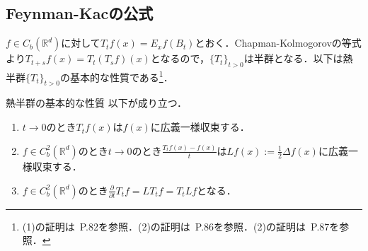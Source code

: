\documentclass[dvipdfmx]{jsarticle}
\begin{document}
\subsection{Feynman-Kacの公式}
$f\in C_b(\mathbb{R}^d)$に対して$T_t f(x)=E_x f(B_t)$とおく．Chapman-Kolmogorovの等式より$T_{t+s}f(x)=T_t(T_s f)(x)$となるので，$\{T_t\}_{t>0}$は半群となる．以下は熱半群$\{T_t\}_{t>0}$の基本的な性質である\footnote{(1)の証明は\cite{Schilling}{\ }P.82を参照．(2)の証明は\cite{Schilling}{\ }P.86を参照．(2)の証明は\cite{Schilling}{\ }P.87を参照．}．
\begin{itembox}[l]{熱半群の基本的な性質}
以下が成り立つ．
\vspace{-0.7zh}%
\begin{enumerate}
\renewcommand{\labelenumi}{(\arabic{enumi})}
\item $t\to 0$のとき$T_t f(x)$は$f(x)$に広義一様収束する．
\item $f\in C^2_b(\mathbb{R}^d)$のとき$t\to 0$のとき$\displaystyle \frac{T_t f(x)-f(x)}{t}$は$\displaystyle Lf(x):=\frac{1}{2}\Delta f(x)$に広義一様収束する．
\item $f\in C^2_b(\mathbb{R}^d)$のとき$\displaystyle \frac{\partial}{\partial t}T_t f=LT_t f=T_tL f$となる．
\end{enumerate}
\end{itembox}
\vspace{-0.7zh}%
\vspace{-0.7zh}%
\vspace{-0.7zh}%
\vspace{-0.7zh}%
\end{document}
